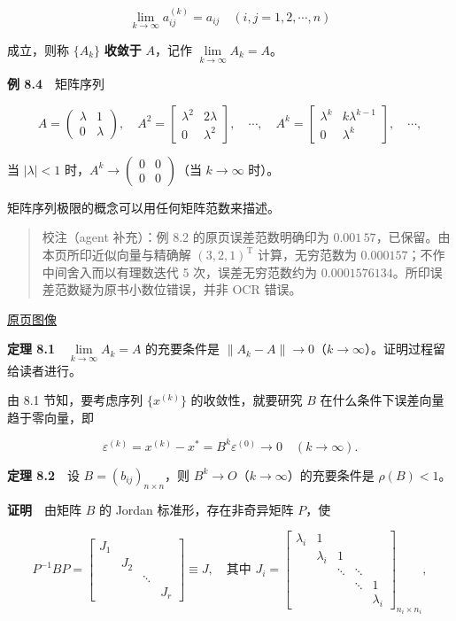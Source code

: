 \documentclass[
  10pt,
  fontset=fandol]{ctexart}
\begin{document}
\[
\lim_{k\to\infty}a_{ij}^{(k)}=a_{ij}\quad(i,j=1,2,\cdots,n)
\]

成立，则称 \(\{A_k\}\) \textbf{收敛于} \(A\)，记作 \(\lim\limits_{k\to\infty}A_k=A\)。

\textbf{例 8.4}　矩阵序列

\[
A=\begin{pmatrix}\lambda&1\\0&\lambda\end{pmatrix},\quad
A^2=\begin{bmatrix}\lambda^2&2\lambda\\0&\lambda^2\end{bmatrix},\quad\cdots,\quad
A^k=\begin{bmatrix}\lambda^k&k\lambda^{k-1}\\0&\lambda^k\end{bmatrix},\quad\cdots,
\]

当 \(|\lambda|<1\) 时，\(A^k\to\begin{pmatrix}0&0\\0&0\end{pmatrix}\)（当 \(k\to\infty\) 时）。

矩阵序列极限的概念可以用任何矩阵范数来描述。

\begin{quote}
校注（agent 补充）：例 8.2 的原页误差范数明确印为 \(0.001\,57\)，已保留。由本页所印近似向量与精确解 \((3,2,1)^{\mathrm T}\) 计算，无穷范数为 \(0.000157\)；不作中间舍入而以有理数迭代 5 次，误差无穷范数约为 \(0.0001576134\)。所印误差范数疑为原书小数位错误，并非 OCR 错误。
\end{quote}

\href{../../source-images/pdf-220.jpeg}{原页图像}

\textbf{定理 8.1}　\(\lim\limits_{k\to\infty}A_k=A\) 的充要条件是 \(\|A_k-A\|\to0\)（\(k\to\infty\)）。证明过程留给读者进行。

由 8.1 节知，要考虑序列 \(\{x^{(k)}\}\) 的收敛性，就要研究 \(B\) 在什么条件下误差向量趋于零向量，即

\[
\varepsilon^{(k)}=x^{(k)}-x^*=B^k\varepsilon^{(0)}\to0\quad(k\to\infty).
\]

\textbf{定理 8.2}　设 \(B=(b_{ij})_{n\times n}\)，则 \(B^k\to O\)（\(k\to\infty\)）的充要条件是 \(\rho(B)<1\)。

\textbf{证明}　由矩阵 \(B\) 的 Jordan 标准形，存在非奇异矩阵 \(P\)，使

\[
P^{-1}BP=\begin{bmatrix}
J_1&&&\\
&J_2&&\\
&&\ddots&\\
&&&J_r
\end{bmatrix}\equiv J,\quad
\text{其中 }J_i=\begin{bmatrix}
\lambda_i&1&&&\\
&\lambda_i&1&&\\
&&\ddots&\ddots&\\
&&&\ddots&1\\
&&&&\lambda_i
\end{bmatrix}_{n_i\times n_i},
\]
\end{document}
